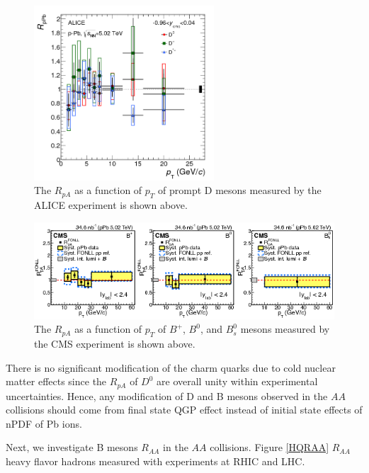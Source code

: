 \begin{figure}[hbtp]
\begin{center}
\includegraphics[width=0.60\textwidth]{Figures/Chapter2/ALICEDRpA.png}
\caption{The $R_{pA}$ as a function of $p_T$ of prompt D mesons measured by the ALICE experiment is shown above.}
\label{DRPA}
\end{center}
\end{figure}   

\begin{figure}[hbtp]
\begin{center}
\includegraphics[width=1.10\textwidth]{Figures/Chapter2/CMSDRpA.png}
\caption{The $R_{pA}$ as a function of $p_T$ of $B^+$, $B^0$, and $B^0_s$ mesons measured by the CMS experiment is shown above.}
\label{BRPA}
\end{center}
\end{figure}   

There is no significant modification of the charm quarks due to cold nuclear matter effects since the $R_{pA}$ of $D^0$ are overall unity within experimental uncertainties. Hence, any modification of D and B mesons observed in the $AA$ collisions should come from final state QGP effect instead of initial state effects of nPDF of Pb ions. 

Next, we investigate B mesons $R_{AA}$ in the $AA$ collisions. Figure \ref{HQRAA} $R_{AA}$ heavy flavor hadrons measured with experiments at RHIC and LHC.

